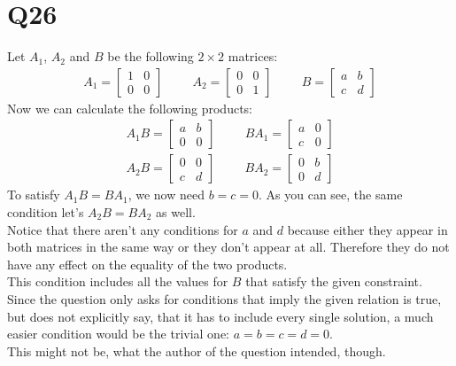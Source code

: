 \documentclass{article}
\begin{document}
\section*{Q26}
Let $A_1$, $A_2$ and $B$ be the following $2\times 2$ matrices:
\begin{align*}
    A_1 = \begin{bmatrix}
        1 &0 \\ 0 &0
    \end{bmatrix}
    \hspace{1cm} A_2 = \begin{bmatrix}
        0 &0 \\ 0 &1
    \end{bmatrix}
    \hspace{1cm} B = \begin{bmatrix}
        a &b \\ c &d
    \end{bmatrix}
\end{align*}
Now we can calculate the following products:
\begin{align*}
    A_1B = \begin{bmatrix}
        a &b \\0 &0
    \end{bmatrix}\hspace{1cm}
    BA_1 = \begin{bmatrix}
        a &0\\
        c &0
    \end{bmatrix}\\
    A_2B = \begin{bmatrix}
        0 &0\\
        c &d
    \end{bmatrix}\hspace{1cm}
    BA_2 = \begin{bmatrix}
        0 &b\\
        0 &d
    \end{bmatrix}
\end{align*}
To satisfy $A_1B=BA_1$, we now need $b = c = 0$. As you can see, the same condition let's $A_2B=BA_2$ as well.\\
Notice that there aren't any conditions for $a$ and $d$ because either they appear in both matrices in the same way or they don't appear at all.
Therefore they do not have any effect on the equality of the two products.\\
This condition includes all the values for $B$ that satisfy the given constraint. 
Since the question only asks for conditions that imply the given relation is true, but does not explicitly say, that it has to include every single solution, a much easier condition would be the trivial one: $a=b=c=d=0$.\\
This might not be, what the author of the question intended, though.
\end{document}
